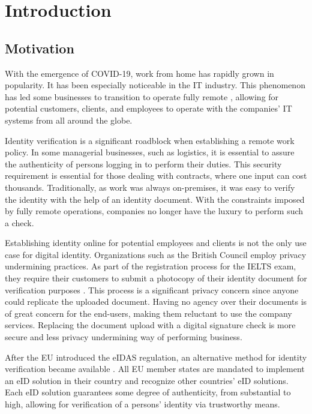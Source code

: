 \section{Introduction}

\subsection{Motivation}

With the emergence of COVID-19, work from home has rapidly grown in popularity. It has been especially noticeable in the IT industry. This phenomenon has led some businesses to transition to operate fully remote \cite{ozimek2020future}, allowing for potential customers, clients, and employees to operate with the companies' IT systems from all around the globe.

Identity verification is a significant roadblock when establishing a remote work policy. In some managerial businesses, such as logistics, it is essential to assure the authenticity of persons logging in to perform their duties. This security requirement is essential for those dealing with contracts, where one input can cost thousands. Traditionally, as work was always on-premises, it was easy to verify the identity with the help of an identity document. With the constraints imposed by fully remote operations, companies no longer have the luxury to perform such a check.

Establishing identity online for potential employees and clients is not the only use case for digital identity. Organizations such as the British Council employ privacy undermining practices. As part of the registration process for the IELTS exam, they require their customers to submit a photocopy of their identity document for verification purposes \cite{ielts-howtoregister}. This process is a significant privacy concern since anyone could replicate the uploaded document. Having no agency over their documents is of great concern for the end-users, making them reluctant to use the company services. Replacing the document upload with a digital signature check is more secure and less privacy undermining way of performing business.

After the EU introduced the eIDAS regulation, an alternative method for identity verification became available \cite{eulaw-eidas}. All EU member states are mandated to implement an eID solution in their country and recognize other countries' eID solutions. Each eID solution guarantees some degree of authenticity, from substantial to high, allowing for verification of a persons' identity via trustworthy means.

